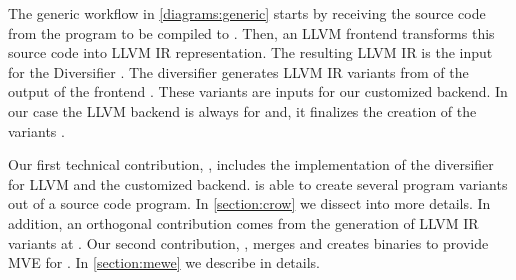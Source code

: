 The generic workflow in \autoref{diagrams:generic} starts by receiving the source code from the program to be compiled to \wasm. Then, an LLVM frontend transforms this source code into LLVM IR representation. The resulting LLVM IR is the input for the Diversifier .  
The diversifier generates LLVM IR variants from of the output of the frontend . These variants are inputs for our customized backend. In our case the LLVM backend is always for \wasm and, it finalizes the creation of the variants . 

Our first technical contribution,  \cite{CROW}, includes the implementation of the diversifier for LLVM and the customized \wasm backend. is able to create several \wasm program variants out of a source code program. In \autoref{section:crow} we dissect into more details.
In addition, an orthogonal contribution comes from the generation of LLVM IR variants at . Our second contribution,  \cite{MEWE}, merges and creates binaries to provide MVE for \wasm {}. In \autoref{section:mewe} we describe in details.

